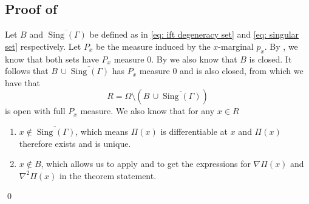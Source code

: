 \documentclass[11pt]{article}
\begin{document}
\subsection{Proof of } \label{sec: proof of differentiability of pi}
Let $B$ and $\overline{\operatorname{Sing}(\Gamma)}$ be defined as in \cref{eq: ift degeneracy set} and \cref{eq: singular set} respectively. Let $P_x$ be the measure induced by the $x$-marginal $p_x$. By ,  we know that both sets have $P_x$ measure $0$. By  we also know that $B$ is closed. It follows that $B \, \cup \overline{\operatorname{Sing}(\Gamma)}$ has $P_x$ measure $0$ and is also closed, from which we have that 
\begin{equation}
    R = \Omega \setminus \left( B \, \cup \overline{\operatorname{Sing}(\Gamma)}\right) \label{eq: good set}
\end{equation}
is open with full $P_x$ measure. We also know that for any $x \in R$
\begin{enumerate}
    \item $x \notin \overline{\operatorname{Sing}(\Gamma)}$, which means $\Pi(x)$ is differentiable at $x$ and $\Pi(x)$ therefore exists and is unique. 
    \item $x \notin B$, which allows us to apply  and  to get the expressions for $\nabla\Pi(x)$ and $\nabla^2\Pi(x)$ in the theorem statement.
\end{enumerate}
\qed{}
\end{document}
